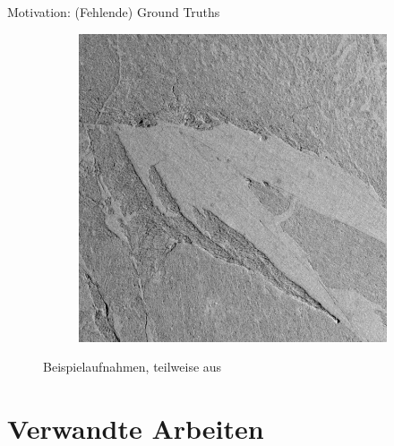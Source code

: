 \documentclass{beamer}
\begin{document}
\begin{frame}{Motivation: (Fehlende) Ground Truths}
\begin{minipage}{0.2\textwidth}
\begin{figure}[h!]
\begin{subfigure}{\textwidth}
		\end{subfigure}
		\begin{subfigure}{\textwidth}
			\includegraphics[width=\textwidth,keepaspectratio]{gfx/p03_03.png}
		\end{subfigure}
		\caption{Beispielaufnahmen, teilweise aus \cite{greeley_13}}
	\end{figure}
\end{minipage}
\end{frame}


\section{Verwandte Arbeiten}
\end{document}
